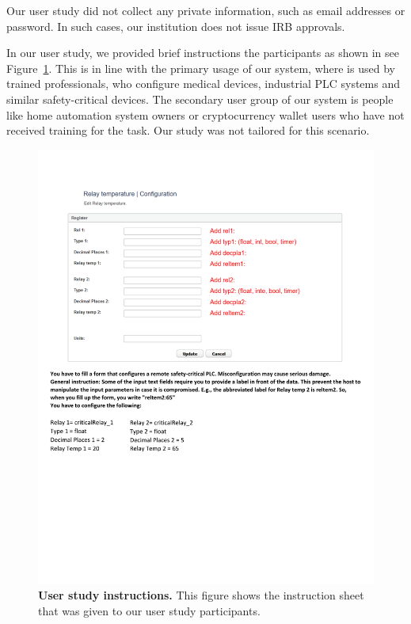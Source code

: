  Our user study did not collect any private information, such as email addresses or password. In such cases, our institution does not issue IRB approvals.

 In our user study, we provided brief instructions the participants as shown in see Figure~\ref{fig:userStudyInstruction}. This is in line with the primary usage of our system, where \name is used by trained professionals, who configure medical devices, industrial PLC systems and similar safety-critical devices. The secondary user group of our system is people like home automation system owners or cryptocurrency wallet users who have not received training for the task. Our study was not tailored for this scenario.


\begin{figure}[t]
 \centering
 \includegraphics[trim={0 8cm 0 2cm}, clip,width=\linewidth]{chapters/IntegriKey/images/userStudy.pdf}
 \caption[User study instructions]{\textbf{User study instructions.} This figure shows the instruction sheet that was given to our user study participants.}
 \label{fig:userStudyInstruction}
\end{figure}

